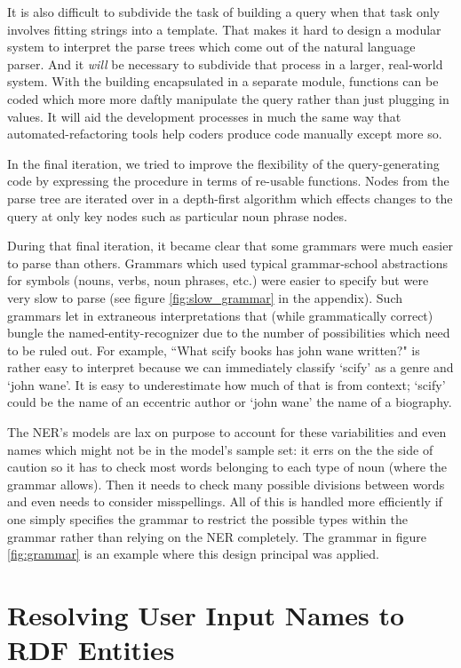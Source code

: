 \documentclass[11pt]{article}
\begin{document}
It is also difficult to subdivide the task of building a query when that task only
involves fitting strings into a template. That makes it hard to design a modular system to
interpret the parse trees which come out of the natural language parser. And it {\em will}
be necessary to subdivide that process in a larger, real-world system. With the building
encapsulated in a separate module, functions can be coded which more more daftly manipulate
the query rather than just plugging in values. It will aid the development processes in
much the same way that automated-refactoring tools help coders produce code manually except
more so.

In the final iteration, we tried to improve the flexibility of the 
query-generating code by expressing the procedure in terms of re-usable
functions. Nodes from the parse tree are iterated over in a depth-first
algorithm which effects changes to the query at only key nodes such
as particular noun phrase nodes.

During that final iteration, it became clear that some grammars were much
easier to parse than others. Grammars which used typical grammar-school abstractions
for symbols (nouns, verbs, noun phrases, etc.) were easier to specify but were very
slow to parse (see figure \ref{fig:slow_grammar} in the appendix). Such grammars let in 
extraneous interpretations that (while grammatically
correct) bungle the named-entity-recognizer due to the number of possibilities which
need to be ruled out. For example, ``What scify books has john wane written?" is rather
easy to interpret because we can immediately classify `scify' as a genre and `john wane'.
It is easy to underestimate how much of that is from context; `scify' could be the
name of an eccentric author or `john wane' the name of a biography.

The NER's models are lax on purpose to account for these variabilities and
even names which might not be in the model's sample set: it errs
on the the side of caution so it has to check most words belonging to each type
of noun (where the grammar allows). Then it needs to check many possible divisions
between words and even needs to consider misspellings. All of this is handled more 
efficiently if one simply specifies the grammar to restrict the possible types 
within the grammar rather than relying on the NER completely. The grammar
in figure \ref{fig:grammar} is an example where this design principal was applied.


\section{Resolving User Input Names to RDF Entities}
\end{document}
